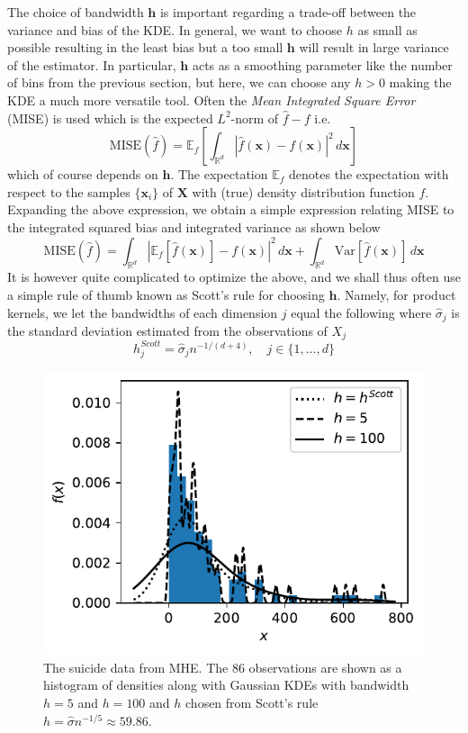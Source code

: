 \documentclass[../Thesis.tex]{subfiles}
\begin{document}
The choice of bandwidth $\boldsymbol h$ is important regarding a trade-off between the variance and bias of the KDE. In general, we want to choose $h$ as small as possible resulting in the least bias but a too small $\boldsymbol h$ will result in large variance of the estimator. In particular, $\boldsymbol h$ acts as a smoothing parameter like the number of bins from the previous section, but here, we can choose any $h > 0$ making the KDE a much more versatile tool. Often the \textit{Mean Integrated Square Error} (MISE) is used which is the expected $L^2$-norm of $\hat{f} - f$ i.e.
$$\text{MISE} \left(\hat{f}\right) = \mathbb{E}_{f} \left[\int_{\mathbb{R}^d} \left| \hat{f}\left(\boldsymbol x\right) - f\left(\boldsymbol x\right)\right|^2 \, d\boldsymbol x\right] $$
which of course depends on $\boldsymbol h$. The expectation $\mathbb{E}_f$ denotes the expectation with respect to the samples $\{\boldsymbol x_i\}$ of $\boldsymbol X$ with (true) density distribution function $f$. Expanding the above expression, we obtain a simple expression relating MISE to the integrated squared bias and integrated variance as shown below
$$\text{MISE} \left(\hat{f}\right) =  \int_{\mathbb{R}^d} \left| \mathbb{E}_{f}\left[\hat{f}\left(\boldsymbol x\right)\right] - f\left(\boldsymbol x\right)\right|^2 \, d\boldsymbol x  +  \int_{\mathbb{R}^d} \text{Var} \left[ \hat{f}\left(\boldsymbol x\right)\right] \, d\boldsymbol x$$
It is however quite complicated to optimize the above, and we shall thus often use a simple rule of thumb known as Scott's rule \cite{Scott1992MultivariateDE} for choosing $\boldsymbol h$. Namely, for product kernels, we let the bandwidths of each dimension $j$ equal the following where $\hat{\sigma}_j$ is the standard deviation estimated from the observations of $X_j$
$$h_{j}^{Scott} = \hat{\sigma}_j n^{-1/(d+4)}, \quad j \in \{1,\dots, d\}$$

\begin{figure}[h]
    \centering
    \includegraphics[width = .6\linewidth]{figures/MI estimation/suicide data example.pdf}
    \caption{The suicide data from MHE. The $86$ observations are shown as a histogram of densities along with Gaussian KDEs with bandwidth $h=5$ and $h=100$ and $h$ chosen from Scott's rule $h = \hat{\sigma} n^{-1/5} \approx 59.86$.}
    \label{fig:suicide KDE example}
\end{figure}
\end{document}
